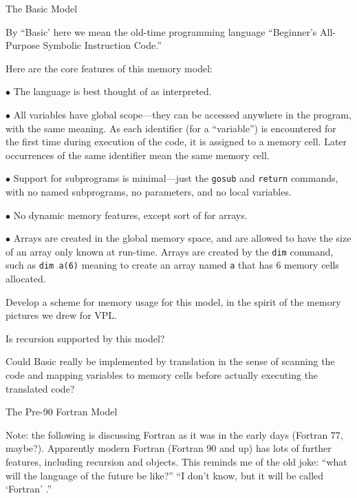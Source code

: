 {\bigboldfont The Basic Model}
\medskip

By ``Basic' here we mean the old-time programming language ``Beginner's 
All-Purpose Symbolic Instruction Code.''
\medskip

Here are the core features of this memory model:
\medskip

  \In
  
  \item{$\bullet$}  The language is best thought of as interpreted.
  \medskip
  
  \item{$\bullet$} All variables have global scope---they 
can be accessed anywhere in the program, with the same
meaning.  As each identifier (for a ``variable'')
 is encountered for the first time during execution of the
code, it is assigned to a memory cell.  Later occurrences of the same identifier 
mean the same memory cell.
  \medskip

  \item{$\bullet$} Support for subprograms is minimal---just 
  the {\tt gosub} and {\tt return}
  commands, with no named subprograms, no
  parameters, and no local variables.
  \medskip

  \item{$\bullet$} No dynamic memory features, except sort of for
  arrays.
  \medskip

  \item{$\bullet$} Arrays are created in the global memory space,
   and are allowed to have the size of an array only known at
   run-time.  Arrays are created by the {\tt dim} command, 
   such as {\tt dim a(6)} meaning to create an array named {\tt a}
   that has 6 memory cells allocated.
  \medskip
\Out

\doit Develop a scheme for memory usage for this model, 
in the spirit of the memory pictures we drew for VPL.  
\medskip

\doit Is recursion supported by this model?
\medskip

\doit Could Basic really be implemented by translation in the sense
of scanning the code and mapping variables to memory cells before
actually executing the translated code?
\border

{\bigboldfont The Pre-90 Fortran Model}
\medskip

Note:  the following is discussing Fortran as it was in the early days (Fortran 77, maybe?).  Apparently modern
Fortran (Fortran 90 and up) has lots of further features, including recursion and objects.
This reminds me of the old joke:  ``what will the language of the future be like?''
``I don't know, but it will be called `Fortran' .''
\medskip

